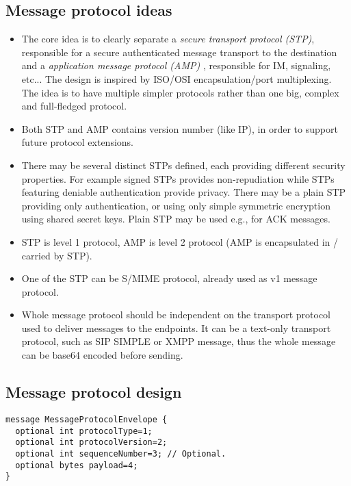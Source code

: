 \documentclass[a4paper,10pt]{article}
\begin{document}
\subsection{Message protocol ideas}
\begin{itemize}
 \item The core idea is to clearly separate a {\it secure transport protocol (STP)}, responsible for a secure authenticated message transport to the destination
and a {\it application message protocol (AMP) }, responsible for IM, signaling, etc... The design is inspired by ISO/OSI encapsulation/port multiplexing.
The idea is to have multiple simpler protocols rather than one big, complex and full-fledged protocol.

 \item Both STP and AMP contains version number (like IP), in order to support future protocol extensions.

 \item There may be several distinct STPs defined, each providing different security properties. 
 For example signed STPs provides non-repudiation while STPs featuring deniable authentication
provide privacy. There may be a plain STP providing only authentication, or using only simple symmetric encryption 
using shared secret keys. Plain STP may be used e.g., for ACK messages.

 \item STP is level 1 protocol, AMP is level 2 protocol (AMP is encapsulated in / carried by STP).
 
 \item One of the STP can be S/MIME protocol, already used as v1 message protocol.  
 
 \item Whole message protocol should be independent on the transport protocol used to deliver messages to the endpoints. It can be
 a text-only transport protocol, such as SIP SIMPLE or XMPP message, thus the whole message can be base64 encoded before sending.
\end{itemize}

\subsection{Message protocol design}
\label{subsec:message_protocol_design}
\begin{Verbatim}[frame=single]
message MessageProtocolEnvelope {
  optional int protocolType=1;
  optional int protocolVersion=2;
  optional int sequenceNumber=3; // Optional.
  optional bytes payload=4;
}
\end{Verbatim} 
\end{document}
